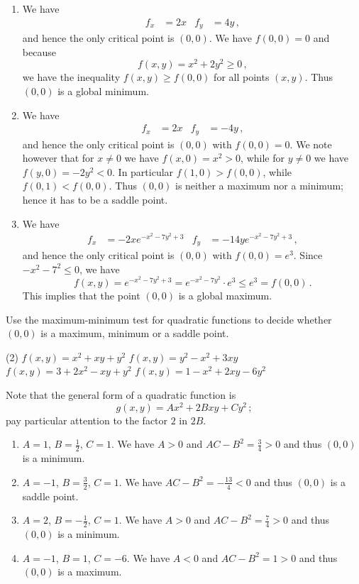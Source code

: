\begin{solution}
\begin{enumerate}
\item
We have
\begin{align*}
f_x &= 2x &
f_y &= 4y\,,
\end{align*}
and hence the only critical point is $(0,0)$. We have $f(0,0) = 0$ and because
\[
f(x,y) = x^2 + 2y^2 \geq 0\,,
\]
we have the inequality $f(x,y) \geq f(0,0)$ for all points $(x,y)$. Thus $(0,0)$ is a global minimum.
\item
We have
\begin{align*}
f_x &= 2x &
f_y &= -4y\,,
\end{align*}
and hence the only critical point is $(0,0)$ with $f(0,0) = 0$. We note however that for $x \neq 0$ we have $f(x,0) =x^2 > 0$, while for $y \neq 0$ we have $f(y,0) = -2y^2 < 0$. In particular $f(1,0) > f(0,0)$, while $f(0,1) < f(0,0)$. Thus $(0,0)$ is neither a maximum nor a minimum; hence it has to be a saddle point.
\item
We have
\begin{align*}
f_x &= -2x e^{-x^2-7y^2+3} &
f_y &= -14y e^{-x^2-7y^2+3}\,,
\end{align*}
and hence the only critical point is $(0,0)$ with $f(0,0) = e^3$. Since $-x^2 -7^2 \leq 0$, we have
\[
f(x,y) = e^{-x^2-7y^2+3} = e^{-x^2-7y^2} \cdot e^3 \leq e^3 = f(0,0)\,.
\]
This implies that the point $(0,0)$ is a global maximum.
\end{enumerate}
\end{solution}

\begin{question}
Use the maximum-minimum test for quadratic functions to decide whether $(0,0)$ is a maximum, minimum or a saddle point.
\begin{tasks}(2)
\task
$f(x,y) = x^2+xy+y^2$
\task
$f(x,y) = y^2-x^2+3xy$
\task
$f(x,y) = 3+2x^2-xy+y^2$
\task
$f(x,y) = 1-x^2+2xy-6y^2$
\end{tasks}
\end{question}

\begin{solution}
Note that the general form of a quadratic function is
\[
g(x,y) = Ax^2 + 2B xy + C y^2\,;
\]
pay particular attention to the factor $2$ in $2B$.
\begin{enumerate}
\item
$A=1$, $B=\frac 12$, $C=1$. We have
$A > 0$ and $AC-B^2= \frac 34 > 0$
and thus $(0,0)$ is a minimum.

\item
$A=-1$, $B=\frac 32$, $C=1$. We have 
$AC-B^2 = -\frac {13}4 < 0$ 
and thus $(0,0)$ is a saddle point.

\item
$A=2$, $B=-\frac 12$, $C=1$. We have 
$A > 0$ and $AC-B^2 = \frac {7}4 > 0$
and thus $(0,0)$ is a minimum.

\item
$A=-1$, $B = 1$, $C=-6$. We have
$A < 0$ and $AC-B^2 = 1 > 0$
and thus $(0,0)$ is a maximum.
\end{enumerate}
\end{solution}

